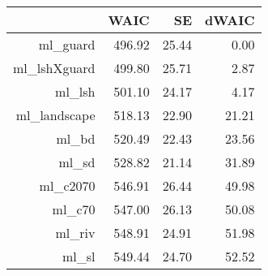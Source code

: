 \begin{table}[ht]
\centering
\begin{tabular}{rrrr}
  \hline
 & WAIC & SE & dWAIC \\ 
  \hline
ml\_guard & 496.92 & 25.44 & 0.00 \\ 
  ml\_lshXguard & 499.80 & 25.71 & 2.87 \\ 
  ml\_lsh & 501.10 & 24.17 & 4.17 \\ 
  ml\_landscape & 518.13 & 22.90 & 21.21 \\ 
  ml\_bd & 520.49 & 22.43 & 23.56 \\ 
  ml\_sd & 528.82 & 21.14 & 31.89 \\ 
  ml\_c2070 & 546.91 & 26.44 & 49.98 \\ 
  ml\_c70 & 547.00 & 26.13 & 50.08 \\ 
  ml\_riv & 548.91 & 24.91 & 51.98 \\ 
  ml\_sl & 549.44 & 24.70 & 52.52 \\ 
   \hline
\end{tabular}
\end{table}
